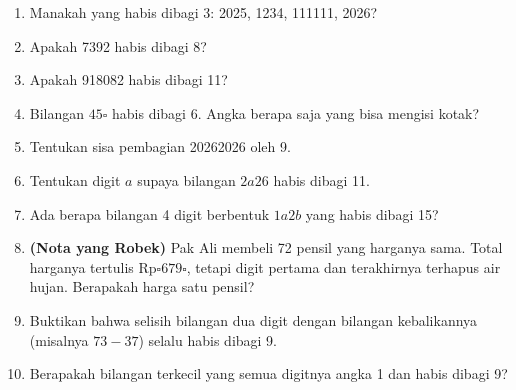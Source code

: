 \documentclass[11pt,a4paper]{article}
\begin{document}
\begin{enumerate}
    \item Manakah yang habis dibagi 3: 2025, 1234, 111111, 2026?
    \item Apakah 7392 habis dibagi 8?
    \item Apakah 918082 habis dibagi 11?
    \item Bilangan $45\square$ habis dibagi 6. Angka berapa saja yang bisa mengisi kotak?
    \item Tentukan sisa pembagian 20262026 oleh 9.
\end{enumerate}

\begin{enumerate}
    \setcounter{enumi}{5}
    \item Tentukan digit $a$ supaya bilangan $2a26$ habis dibagi 11.
    \item Ada berapa bilangan 4 digit berbentuk $1a2b$ yang habis dibagi 15?
    \item \textbf{(Nota yang Robek)} Pak Ali membeli 72 pensil yang harganya sama. Total harganya
          tertulis Rp$\square679\square$, tetapi digit pertama dan terakhirnya terhapus air hujan.
          Berapakah harga satu pensil?
    \item Buktikan bahwa selisih bilangan dua digit dengan bilangan kebalikannya (misalnya
          $73 - 37$) selalu habis dibagi 9.
    \item Berapakah bilangan terkecil yang semua digitnya angka 1 dan habis dibagi 9?
\end{enumerate}
\end{document}
